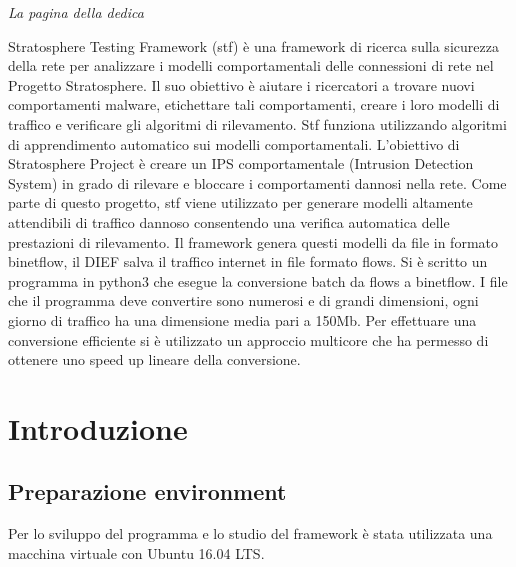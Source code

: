 \documentclass[11pt,a4paper,twoside,openright]{book}
\newenvironment{abstract}%
	{\cleardoublepage%
		\thispagestyle{empty}%
		\null \vfill\begin{center}%
			\bfseries \abstractname \end{center}}%
	{\vfill\null}
\begin{document}
\begin{frontespizio}
\end{frontespizio}

\null{}
\begin{flushright}
				\textit{La pagina della dedica}
\end{flushright}
\null

\cite{Stratosphere}
\begin{abstract}
				Stratosphere Testing Framework (stf) è una framework di ricerca sulla sicurezza della rete per analizzare i modelli comportamentali delle connessioni di rete nel Progetto Stratosphere. Il suo obiettivo è aiutare i ricercatori a trovare nuovi comportamenti malware, etichettare tali comportamenti, creare i loro modelli di traffico e verificare gli algoritmi di rilevamento. Stf funziona utilizzando algoritmi di apprendimento automatico sui modelli comportamentali.
				L'obiettivo di Stratosphere Project è creare un IPS comportamentale (Intrusion Detection System) in grado di rilevare e bloccare i comportamenti dannosi nella rete. Come parte di questo progetto, stf viene utilizzato per generare modelli altamente attendibili di traffico dannoso consentendo una verifica automatica delle prestazioni di rilevamento.
				Il framework genera questi modelli da file in formato binetflow, il DIEF salva il traffico internet in file formato flows.
				Si è scritto un programma in python3 che esegue la conversione batch da flows a binetflow.
				I file che il programma deve convertire sono numerosi e di grandi dimensioni, ogni giorno di traffico ha una dimensione media pari a 150Mb.
				Per effettuare una conversione efficiente si è utilizzato un approccio multicore che ha permesso di ottenere uno speed up lineare della conversione. 
\end{abstract}

\newpage

\chapter{Introduzione}

\section{Preparazione environment}
Per lo sviluppo del programma e lo studio del framework è stata utilizzata una macchina virtuale con Ubuntu 16.04 LTS.
\end{document}
